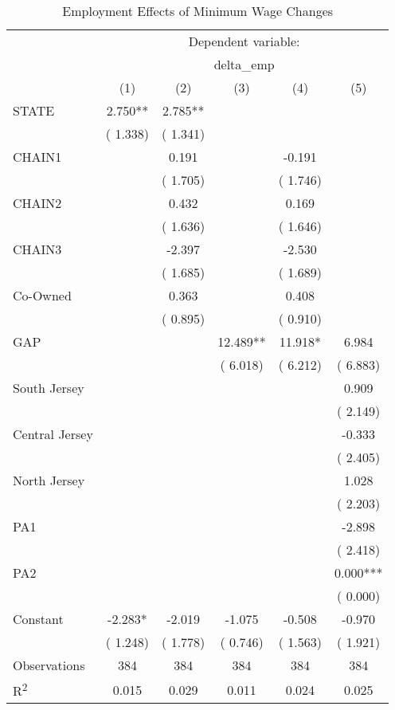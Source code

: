 \documentclass{article}
\begin{document}
\setcounter{table}{3}
\begin{table}[htbp]
\centering
\caption{Employment Effects of Minimum Wage Changes}
\begin{tabular}{lccccc}
\toprule
 & \multicolumn{5}{c}{Dependent variable:} \\
\cmidrule(lr){2-6}
 & \multicolumn{5}{c}{delta\_emp} \\
 & (1) & (2) & (3) & (4) & (5) \\
\midrule
STATE &  2.750** &  2.785** & & & \\
 & ( 1.338) & ( 1.341) & & & \\
CHAIN1 & &  0.191 & & -0.191 & \\
 & & ( 1.705) & & ( 1.746) & \\
CHAIN2 & &  0.432 & &  0.169 & \\
 & & ( 1.636) & & ( 1.646) & \\
CHAIN3 & & -2.397 & & -2.530 & \\
 & & ( 1.685) & & ( 1.689) & \\
Co-Owned & &  0.363 & &  0.408 & \\
 & & ( 0.895) & & ( 0.910) & \\
GAP & & & 12.489** & 11.918* &  6.984 \\
 & & & ( 6.018) & ( 6.212) & ( 6.883) \\
South Jersey & & & & &  0.909 \\
 & & & & & ( 2.149) \\
Central Jersey & & & & & -0.333 \\
 & & & & & ( 2.405) \\
North Jersey & & & & &  1.028 \\
 & & & & & ( 2.203) \\
PA1 & & & & & -2.898 \\
 & & & & & ( 2.418) \\
PA2 & & & & &  0.000*** \\
 & & & & & ( 0.000) \\
Constant & -2.283* & -2.019 & -1.075 & -0.508 & -0.970 \\
 & ( 1.248) & ( 1.778) & ( 0.746) & ( 1.563) & ( 1.921) \\
\midrule
Observations &       384 &       384 &       384 &       384 &       384 \\
R\textsuperscript{2} & 0.015 & 0.029 & 0.011 & 0.024 & 0.025 \\
\bottomrule
\end{tabular}
\end{table}
\end{document}
